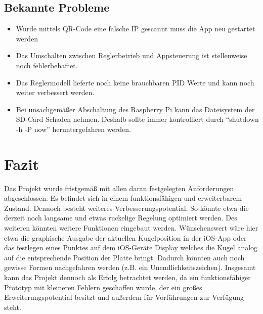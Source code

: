 \documentclass[12pt,a4paper,bibliography=totoc,listof=totoc]{scrartcl}
\begin{document}
\subsection{Bekannte Probleme}
\begin{itemize}
    \item Wurde mittels QR-Code eine falsche IP gescannt muss die App neu gestartet werden\,
    \item Das Umschalten zwischen Reglerbetrieb und Appsteuerung ist stellenweise noch fehlerbehaftet.\,
    \item Das Reglermodell lieferte noch keine brauchbaren PID Werte und kann noch weiter verbessert werden.\,
    \item Bei unsachgemäßer Abschaltung des Raspberry Pi kann das Dateisystem der SD-Card Schaden nehmen. Deshalb sollte immer kontrolliert durch ``shutdown -h -P now'' heruntergefahren werden.\,
\end {itemize}


\pagebreak
\section{Fazit}
Das Projekt wurde fristgemäß mit allen daran festgelegten Anforderungen abgeschlossen. Es befindet sich in einem 
funktionsfähigen und erweiterbarem Zustand. Dennoch besteht weiteres Verbesserungspotential. So könnte etwa die 
derzeit noch langsame und etwas ruckelige Regelung optimiert werden. Des weiteren könnten weitere Funktionen eingebaut werden. 
Wünschenswert wäre hier etwa die graphische Ausgabe der aktuellen Kugelposition in der iOS-App oder das festlegen eines Punktes auf
dem iOS-Geräte Display welches die Kugel analog auf die entsprechende Position der Platte bringt. Dadurch könnten auch noch gewisse 
Formen nachgefahren werden (z.B. ein Unendlichkeitszeichen).
\newline
Insgesamt kann das Projekt dennoch als Erfolg betrachtet werden, da ein funktionsfähiger Prototyp mit kleineren Fehlern geschaffen wurde, 
der ein großes Erweiterungspotential besitzt und außerdem für Vorführungen zur Verfügung steht.

\pagebreak



\setcounter{page}{1}
\end{document}
